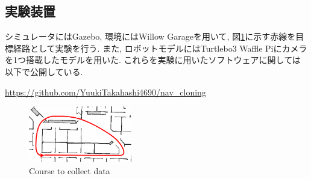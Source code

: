 \documentclass{ujarticle}
\begin{document}
\subsection{実験装置}シミュレータにはGazebo\cite{gazebo}, 環境にはWillow Garage\cite{willow}を用いて, 図\ref{Fig:willow}に示す赤線を目標経路として実験を行う. また, ロボットモデルにはTurtlebo3 Waffle Pi\cite{turtlebot3}にカメラを1つ搭載したモデルを用いた. これらを実験に用いたソフトウェアに関しては以下で公開している. \par \url{https://github.com/YuukiTakahashi4690/nav_cloning}

\begin{figure}[h]
		\centering
		\includegraphics[width=0.4\textwidth]{img/willow-path.png}
		\caption{Course to collect data}
		\label{Fig:willow}
\end{figure}
\end{document}
